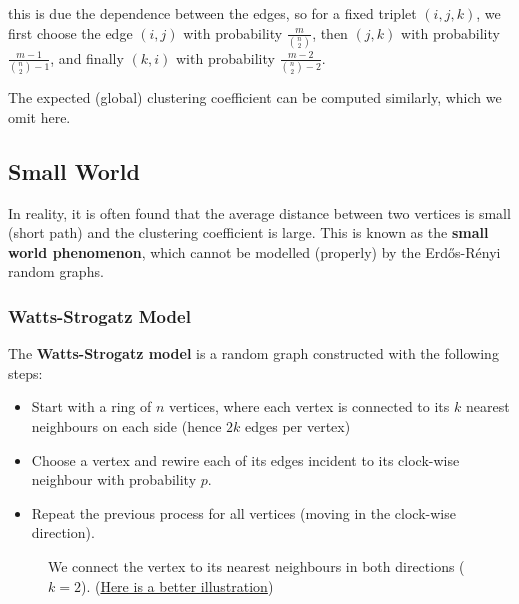 \documentclass{article}
\begin{document}
this is due the dependence between the edges, so for a fixed triplet $(i,j,k)$, we first choose the edge $(i,j)$ with probability $\frac{m}{\binom{n}{2}}$, then $(j,k)$ with probability $\frac{m-1}{\binom{n}{2}-1}$, and finally $(k,i)$ with probability $\frac{m-2}{\binom{n}{2}-2}$.  

The expected (global) clustering coefficient can be computed similarly, which we omit here.  

\subsection{Small World}

In reality, it is often found that the average distance between two vertices is small (short path) and the clustering coefficient is large. This is known as the \textbf{small world phenomenon}, which cannot be modelled (properly) by the Erd\H{o}s-R\'{e}nyi random graphs.  

\subsubsection{Watts-Strogatz Model}
The \textbf{Watts-Strogatz model} is a random graph constructed with the following steps:
\begin{itemize}
    \item Start with a ring of $n$ vertices, where each vertex is connected to its $k$ nearest neighbours on each side (hence $2k$ edges per vertex)
    \item Choose a vertex and rewire each of its edges incident to its clock-wise neighbour with probability $p$.
    \item Repeat the previous process for all vertices (moving in the clock-wise direction).
\end{itemize}

\begin{figure}[H]
    \centering
    \caption{We connect the vertex to its nearest neighbours in both directions ($k=2$). (\href{https://www.kth.se/social/files/5605669af2765468be471eda/lecture\%204\%20\%282015\%29.pdf}{Here is a better illustration})}
    \label{fig:watts-strogatz}
\end{figure}
\end{document}
